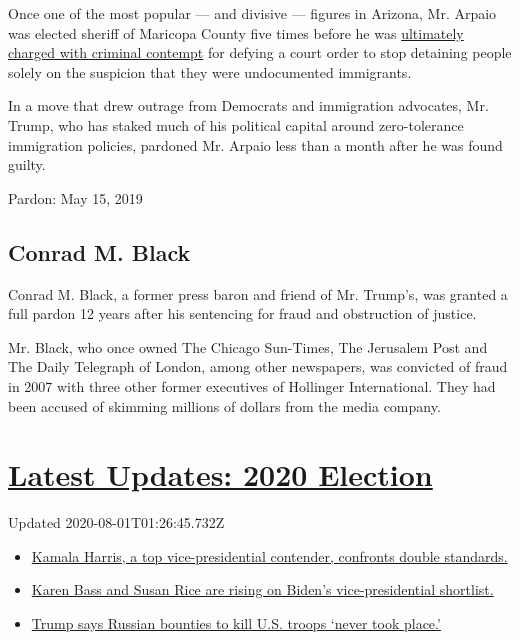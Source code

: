 Once one of the most popular --- and divisive --- figures in Arizona,
Mr. Arpaio was elected sheriff of Maricopa County five times before he
was
\href{https://www.nytimes.com/2017/07/31/us/sheriff-joe-arpaio-convicted-arizona.html}{ultimately
charged with criminal contempt} for defying a court order to stop
detaining people solely on the suspicion that they were undocumented
immigrants.

In a move that drew outrage from Democrats and immigration advocates,
Mr. Trump, who has staked much of his political capital around
zero-tolerance immigration policies, pardoned Mr. Arpaio less than a
month after he was found guilty.

Pardon: May 15, 2019

\hypertarget{conrad-m-black}{%
\subsection{Conrad M. Black}\label{conrad-m-black}}

Conrad M. Black, a former press baron and friend of Mr. Trump's, was
granted a full pardon 12 years after his sentencing for fraud and
obstruction of justice.

Mr. Black, who once owned The Chicago Sun-Times, The Jerusalem Post and
The Daily Telegraph of London, among other newspapers, was convicted of
fraud in 2007 with three other former executives of Hollinger
International. They had been accused of skimming millions of dollars
from the media company.

\hypertarget{latest-updates-2020-election}{%
\section{\texorpdfstring{\href{https://www.nytimes.com/2020/07/31/us/elections/biden-vs-trump.html?action=click\&pgtype=Article\&state=default\&region=MAIN_CONTENT_1\&context=storylines_live_updates}{Latest
Updates: 2020
Election}}{Latest Updates: 2020 Election}}\label{latest-updates-2020-election}}

Updated 2020-08-01T01:26:45.732Z

\begin{itemize}
\tightlist
\item
  \href{https://www.nytimes.com/2020/07/31/us/elections/biden-vs-trump.html?action=click\&pgtype=Article\&state=default\&region=MAIN_CONTENT_1\&context=storylines_live_updates\#link-29fdff45}{Kamala
  Harris, a top vice-presidential contender, confronts double
  standards.}
\item
  \href{https://www.nytimes.com/2020/07/31/us/elections/biden-vs-trump.html?action=click\&pgtype=Article\&state=default\&region=MAIN_CONTENT_1\&context=storylines_live_updates\#link-13ec3d9c}{Karen
  Bass and Susan Rice are rising on Biden's vice-presidential
  shortlist.}
\item
  \href{https://www.nytimes.com/2020/07/31/us/elections/biden-vs-trump.html?action=click\&pgtype=Article\&state=default\&region=MAIN_CONTENT_1\&context=storylines_live_updates\#link-49e9a016}{Trump
  says Russian bounties to kill U.S. troops `never took place.'}
\end{itemize}

